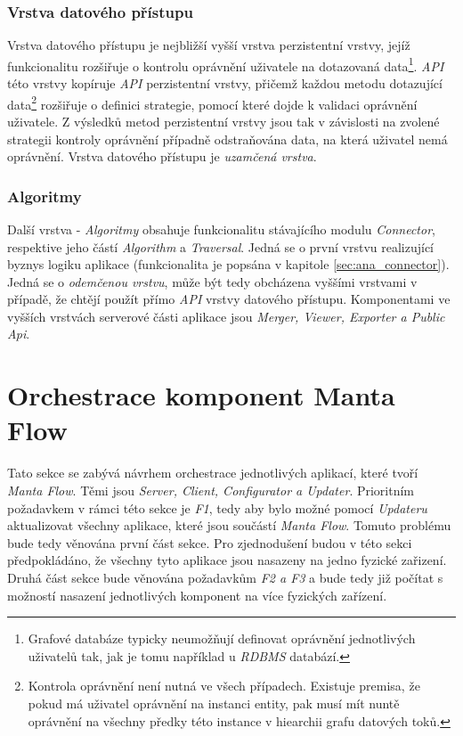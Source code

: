 \subsubsection{Vrstva datového přístupu}
\label{sec:des_data_access}
Vrstva datového přístupu je nejbližší vyšší vrstva perzistentní vrstvy, jejíž funkcionalitu rozšiřuje o kontrolu oprávnění uživatele na dotazovaná data\footnote{Grafové databáze typicky neumožňují definovat oprávnění jednotlivých uživatelů tak, jak je tomu například u \textit{RDBMS} databází.}. \textit{API} této vrstvy kopíruje \textit{API} perzistentní vrstvy, přičemž každou metodu dotazující data\footnote{Kontrola oprávnění není nutná ve všech případech. Existuje premisa, že pokud má uživatel oprávnění na instanci entity, pak musí mít nuntě oprávnění na všechny předky této instance v hiearchii grafu datových toků.} rozšiřuje o definici strategie, pomocí které dojde k validaci oprávnění uživatele. Z výsledků metod perzistentní vrstvy jsou tak v závislosti na zvolené strategii kontroly oprávnění případně odstraňována data, na která uživatel nemá oprávnění. Vrstva datového přístupu je \textit{uzamčená vrstva}.

\subsubsection{Algoritmy}
Další vrstva - \textit{Algoritmy} obsahuje funkcionalitu stávajícího modulu \textit{Connector}, respektive jeho částí \textit{Algorithm} a \textit{Traversal}. Jedná se o první vrstvu realizující byznys logiku aplikace (funkcionalita je popsána v kapitole \ref{sec:ana_connector}). Jedná se o \textit{odemčenou vrstvu}, může být tedy obcházena vyššími vrstvami v případě, že chtějí použít přímo \textit{API} vrstvy datového přístupu. Komponentami ve vyšších vrstvách serverové části aplikace jsou \textit{Merger, Viewer, Exporter a Public Api}.


\section{Orchestrace komponent Manta Flow}
\label{sec:des_orchestration}
Tato sekce se zabývá návrhem orchestrace jednotlivých aplikací, které tvoří \textit{Manta Flow}. Těmi jsou \textit{Server, Client, Configurator a Updater}. Prioritním požadavkem v rámci této sekce je \textit{F1}, tedy aby bylo možné pomocí \textit{Updateru} aktualizovat všechny aplikace, které jsou součástí \textit{Manta Flow}. Tomuto problému bude tedy věnována první část sekce. Pro zjednodušení budou v této sekci předpokládáno, že všechny tyto aplikace jsou nasazeny na jedno fyzické zařizení. Druhá část sekce bude věnována požadavkům \textit{F2 a F3} a bude tedy již počítat s možností nasazení jednotlivých komponent na více fyzických zařízení.

